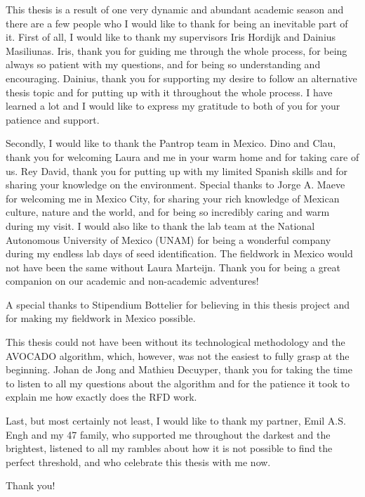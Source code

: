 


This thesis is a result of one very dynamic and abundant academic season and there are a few people who I would like to thank for being an inevitable part of it. First of all, I would like to thank my supervisors Iris Hordijk and Dainius Masiliunas. Iris, thank you for guiding me through the whole process, for being always so patient with my questions, and for being so understanding and encouraging. Dainius, thank you for supporting my desire to follow an alternative thesis topic and for putting up with it throughout the whole process. I have learned a lot and I would like to express my gratitude to both of you for your patience and support.

Secondly, I would like to thank the Pantrop team in Mexico. Dino and Clau, thank you for welcoming Laura and me in your warm home and for taking care of us. Rey David, thank you for putting up with my limited Spanish skills and for sharing your knowledge on the environment. Special thanks to Jorge A. Maeve for welcoming me in Mexico City, for sharing your rich knowledge of Mexican culture, nature and the world, and for being so incredibly caring and warm during my visit. I would also like to thank the lab team at the National Autonomous University of Mexico (UNAM) for being a wonderful company during my endless lab days of seed identification. The fieldwork in Mexico would not have been the same without Laura Marteijn. Thank you for being a great companion on our academic and non-academic adventures!

A special thanks to Stipendium Bottelier for believing in this thesis project and for making my fieldwork in Mexico possible.

This thesis could not have been without its technological methodology and the AVOCADO algorithm, which, however, was not the easiest to fully grasp at the beginning. Johan de Jong and Mathieu Decuyper, thank you for taking the time to listen to all my questions about the algorithm and for the patience it took to explain me how exactly does the RFD work. 

Last, but most certainly not least, I would like to thank my partner, Emil A.S. Engh and my 47 family, who supported me throughout the darkest and the brightest, listened to all my rambles about how it is not possible to find the perfect threshold, and who celebrate this thesis with me now. 

Thank you!